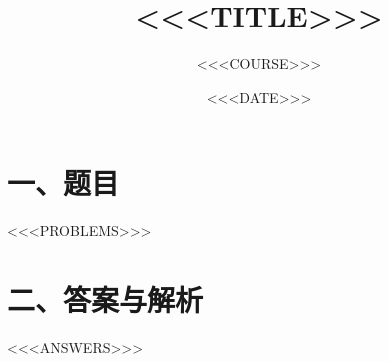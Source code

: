 \documentclass[11pt]{ctexart}
\title{<<<TITLE>>>}
\author{<<<COURSE>>>}
\date{<<<DATE>>>}
\begin{document}
\maketitle

\section*{一、题目}
<<<PROBLEMS>>>

\newpage
\section*{二、答案与解析}
<<<ANSWERS>>>
\end{document}
